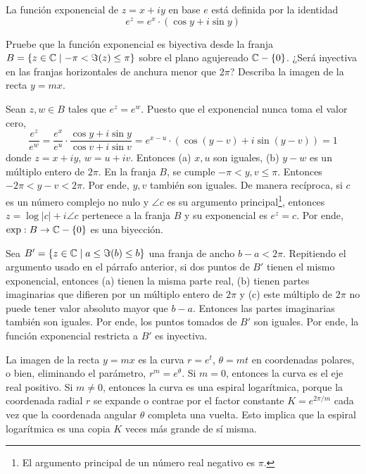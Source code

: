\begin{exercise}
La función exponencial de $z = x + iy$ en base $e$ está definida por la identidad
$$e^z = e^x \cdot (\cos y + i \sin y)$$

Pruebe que la función exponencial es biyectiva desde la franja $B = \{ z \in \mathbb C \mid -\pi < \Im(z) \le \pi \}$ sobre el plano agujereado $\mathbb C - \{ 0 \}$. ¿Será inyectiva en las franjas horizontales de anchura menor que $2\pi$? Describa la imagen de la recta $y = mx$.
\end{exercise}

\begin{solution}
Sean $z, w \in B$ tales que $e^z = e^w$. Puesto que el exponencial nunca toma el valor cero,
$$
\frac {e^z} {e^w}
    = \frac {e^x} {e^u} \cdot \frac {\cos y + i \sin y} {\cos v + i \sin v}
    = e^{x-u} \cdot (\cos (y-v) + i \sin (y-v))
    = 1
$$
donde $z = x + iy$, $w = u + iv$. Entonces (a) $x, u$ son iguales, (b) $y - w$ es un múltiplo entero de $2\pi$. En la franja $B$, se cumple $-\pi < y, v \le \pi$. Entonces $-2\pi < y - v < 2\pi$. Por ende, $y, v$ también son iguales. De manera recíproca, si $c$ es un número complejo no nulo y $\angle c$ es su argumento principal\footnote{El argumento principal de un número real negativo es $\pi$.}, entonces $z = \log |c| + i \angle c$ pertenece a la franja $B$ y su exponencial es $e^z = c$. Por ende, $\exp : B \to \mathbb C - \{ 0 \}$ es una biyección.

Sea $B' = \{ z \in \mathbb C \mid a \le \Im(b) \le b \}$ una franja de ancho $b-a < 2\pi$. Repitiendo el argumento usado en el párrafo anterior, si dos puntos de $B'$ tienen el mismo exponencial, entonces (a) tienen la misma parte real, (b) tienen partes imaginarias que difieren por un múltiplo entero de $2\pi$ y (c) este múltiplo de $2\pi$ no puede tener valor absoluto mayor que $b-a$. Entonces las partes imaginarias también son iguales. Por ende, los puntos tomados de $B'$ son iguales. Por ende, la función exponencial restricta a $B'$ es inyectiva.

La imagen de la recta $y = mx$ es la curva $r = e^t$, $\theta = mt$ en coordenadas polares, o bien, eliminando el parámetro, $r^m = e^\theta$. Si $m = 0$, entonces la curva es el eje real positivo. Si $m \ne 0$, entonces la curva es una espiral logarítmica, porque la coordenada radial $r$ se expande o contrae por el factor constante $K = e^{2\pi/m}$ cada vez que la coordenada angular $\theta$ completa una vuelta. Esto implica que la espiral logarítmica es una copia $K$ veces más grande de sí misma.
\end{solution}
